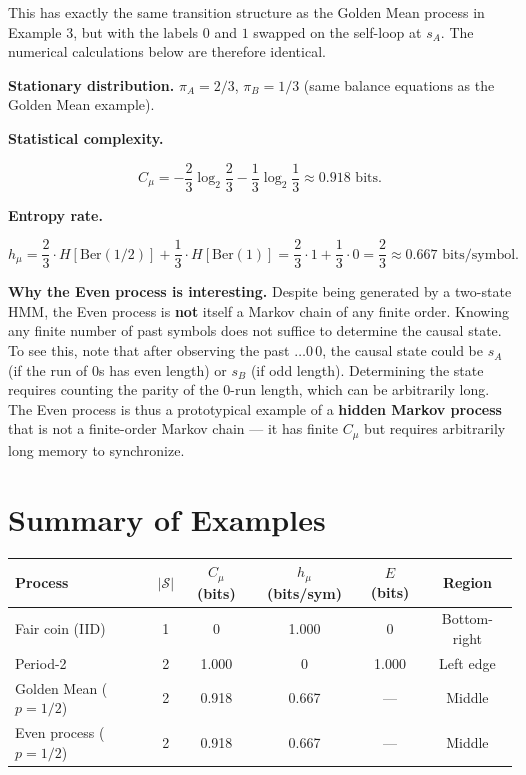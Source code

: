 \begin{remark}
This has exactly the same transition structure as the Golden Mean process in Example 3, but with the labels $0$ and $1$ swapped on the self-loop at $s_A$. The numerical calculations below are therefore identical.

\textbf{Stationary distribution.} $\pi_A = 2/3$, $\pi_B = 1/3$ (same balance equations as the Golden Mean example).

\textbf{Statistical complexity.}

\[C_\mu = -\frac{2}{3}\log_2\frac{2}{3} - \frac{1}{3}\log_2\frac{1}{3} \approx 0.918 \text{ bits}.\]

\textbf{Entropy rate.}

\[h_\mu = \frac{2}{3} \cdot H[\text{Ber}(1/2)] + \frac{1}{3} \cdot H[\text{Ber}(1)] = \frac{2}{3} \cdot 1 + \frac{1}{3} \cdot 0 = \frac{2}{3} \approx 0.667 \text{ bits/symbol}.\]

\textbf{Why the Even process is interesting.} Despite being generated by a two-state HMM, the Even process is \textbf{not} itself a Markov chain of any finite order. Knowing any finite number of past symbols does not suffice to determine the causal state. To see this, note that after observing the past $\ldots 0\, 0$, the causal state could be $s_A$ (if the run of $0$s has even length) or $s_B$ (if odd length). Determining the state requires counting the parity of the $0$-run length, which can be arbitrarily long. The Even process is thus a prototypical example of a \textbf{hidden Markov process} that is not a finite-order Markov chain --- it has finite $C_\mu$ but requires arbitrarily long memory to synchronize.
\end{remark}



\section{Summary of Examples}

\begin{center}
\begin{tabular}{lccccc}
\toprule
Process & $|\mathcal{S}|$ & $C_\mu$ (bits) & $h_\mu$ (bits/sym) & $E$ (bits) & Region \\
\midrule
Fair coin (IID) & 1 & 0 & 1.000 & 0 & Bottom-right \\
Period-2 & 2 & 1.000 & 0 & 1.000 & Left edge \\
Golden Mean ($p=1/2$) & 2 & 0.918 & 0.667 & --- & Middle \\
Even process ($p=1/2$) & 2 & 0.918 & 0.667 & --- & Middle \\
\bottomrule
\end{tabular}
\end{center}

